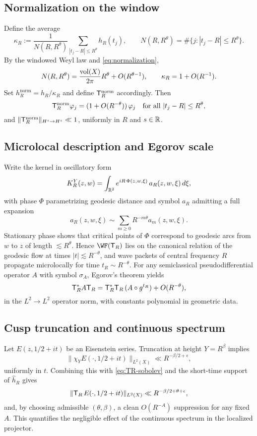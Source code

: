 \subsection{Normalization on the window}\label{subsec:proj-normal}
Define the average
\[
\kappa_R:=\frac{1}{N(R,R^\theta)}\sum_{|t_j-R|\le R^\theta} h_R(t_j),
\qquad
N(R,R^\theta)=\#\{j:|t_j-R|\le R^\theta\}.
\]
By the windowed Weyl law and \eqref{eq:normalization},
\[
N(R,R^\theta)=\frac{\operatorname{vol}(X)}{2\pi}R^\theta+O(R^{\theta-1}),
\qquad
\kappa_R=1+O(R^{-1}).
\]
Set $h_R^{\mathrm{norm}}=h_R/\kappa_R$ and define $\mathsf{T}_R^{\mathrm{norm}}$ accordingly.
Then
\begin{equation}\label{eq:norm-identity}
\mathsf{T}_R^{\mathrm{norm}}\varphi_j=(1+O(R^{-\theta}))\,\varphi_j
\quad\text{for all }|t_j-R|\le R^\theta,
\end{equation}
and $\|\mathsf{T}_R^{\mathrm{norm}}\|_{H^s\to H^s}\ll 1$, uniformly in $R$ and $s\in\mathbb{R}$.

\subsection{Microlocal description and Egorov scale}\label{subsec:proj-micro}
Write the kernel in oscillatory form
\[
K_R^Y(z,w)=\int_{\mathbb{R}^2} e^{iR\,\Phi(z,w,\xi)}\,a_R(z,w,\xi)\,d\xi,
\]
with phase $\Phi$ parametrizing geodesic distance and symbol $a_R$ admitting a full expansion
\[
a_R(z,w,\xi)\sim\sum_{m\ge0} R^{-m\theta} a_m(z,w,\xi).
\]
Stationary phase shows that critical points of $\Phi$ correspond to geodesic arcs from $w$ to $z$ of length $\lesssim R^\theta$.
Hence $\WF(\TR)$ lies on the canonical relation of the geodesic flow at times $|t|\lesssim R^{-\theta}$, and wave packets of central frequency $R$ propagate microlocally for time $t_R\sim R^{-\theta}$.
For any semiclassical pseudodifferential operator $A$ with symbol $\sigma_A$, Egorov’s theorem yields
\begin{equation}\label{eq:egorov}
\mathsf{T}_R^* A \mathsf{T}_R = \mathsf{T}_R^*\mathsf{T}_R\,(A\circ g^{t_R}) + O(R^{-\theta}),
\end{equation}
in the $L^2\to L^2$ operator norm, with constants polynomial in geometric data.

\subsection{Cusp truncation and continuous spectrum}\label{subsec:proj-cusp}
Let $E(z,1/2+it)$ be an Eisenstein series.
Truncation at height $Y=R^\beta$ implies
\[
\|\chi_Y E(\cdot,1/2+it)\|_{L^2(X)}\ll R^{-\beta/2+\epsilon},
\]
uniformly in $t$.
Combining this with \eqref{eq:TR-sobolev} and the short-time support of $\widehat{h}_R$ gives
\begin{equation}\label{eq:eisenstein-suppression}
\|\mathsf{T}_R\,E(\cdot,1/2+it)\|_{L^2(X)}\ll R^{-\beta/2+\theta+\epsilon},
\end{equation}
and, by choosing admissible $(\theta,\beta)$, a clean $O(R^{-A})$ suppression for any fixed $A$.
This quantifies the negligible effect of the continuous spectrum in the localized projector.

